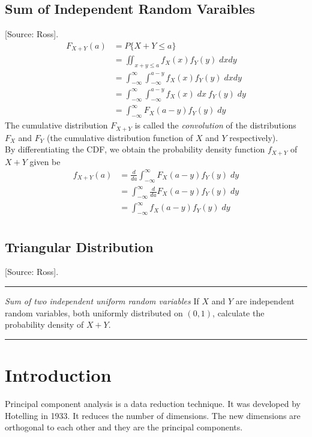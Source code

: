 \documentclass[12pt,a4paper]{report}
\begin{document}
\subsection{Sum of Independent Random Varaibles}
[Source: Ross]. \\
\begin{align*}
F_{X+Y}(a) &=  P \{ X+Y \leq a \} \\
&= \iint_{x+y \leq a} f_X(x) f_Y(y) \;  dx dy \\
&= \int_{-\infty}^{\infty} \int_{-\infty}^{a-y} f_X(x) f_Y(y) \; dx  dy \\
&= \int_{-\infty}^{\infty} \int_{-\infty}^{a-y} f_X(x) \; dx \ f_Y(y) \;  dy \\
&= \int_{-\infty}^{\infty} F_X(a-y)f_Y(y) \; dy
\end{align*}
The cumulative distribution $F_{X+Y}$ is called the \textit{convolution} of the distributions $F_X$ and $F_Y$ (the cumulative distribution function of $X$ and $Y$ respectively). \\
By differentiating the CDF, we obtain the probability density function $f_{X+Y}$ of $X+Y$ given be
\begin{align*}
f_{X+Y}(a) &= \frac{d}{da} \int_{-\infty}^{\infty} F_X(a-y)f_Y(y) \; dy \\
 &= \int_{-\infty}^{\infty} \frac{d}{da}  F_X(a-y)f_Y(y) \; dy \\
 &= \int_{-\infty}^{\infty} f_X(a-y)f_Y(y) \; dy \\
\end{align*}
\subsection{Triangular Distribution}
[Source: Ross]. \\
\noindent
{\color{red} \rule{\linewidth}{0.5mm} } \textit{Sum of two independent uniform random variables} {\color{red} If $X$ and $Y$ are independent random variables, both uniformly distributed on $(0,1)$, calculate the probability density of $X+Y$}. \\
\noindent
{\color{red} \rule{\linewidth}{0.5mm} }
\section{Introduction}
Principal component analysis is a data reduction technique. It was developed by Hotelling in 1933. It reduces the number of dimensions. The new dimensions are orthogonal to each other and they are the principal components. 
\end{document}

